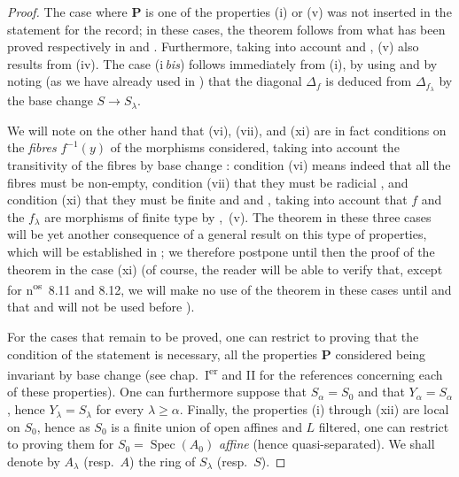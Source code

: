 \begin{proof}
The case where $\mathbf{P}$ is one of the properties (i) or (v) was not inserted in the statement for the record; in these cases, the theorem follows from what has been proved respectively in  and .
Furthermore, taking into account  and , (v) also results from (iv).
The case (i\,\emph{bis}) follows immediately from (i), by using  and by noting (as we have already used in ) that the diagonal $\Delta_f$ is deduced from $\Delta_{f_\lambda}$ by the base change $S\to S_\lambda$.

We will note on the other hand that (vi), (vii), and (xi) are in fact conditions on the \emph{fibres} $f^{-1}(y)$ of the morphisms considered, taking into account the transitivity of the fibres by base change : condition (vi) means indeed that all the fibres must be non-empty, condition (vii) that they must be radicial , and condition (xi) that they must be finite  and  and , taking into account that $f$ and the $f_\lambda$ are morphisms of finite type by ,~(v).
The theorem in these three cases will be yet another consequence of a general result on this type of properties, which will be established in ; we therefore postpone until then the proof of the theorem in the case (xi) (of course, the reader will be able to verify that, except for n\textsuperscript{os}~8.11 and 8.12, we will make no use of the theorem in these cases until  and that  and  will not be used before ).

For the cases that remain to be proved, one can restrict to proving that the condition of the statement is necessary, all the properties $\mathbf{P}$ considered being invariant by base change (see chap.~I\textsuperscript{er} and II for the references concerning each of these properties).
One can furthermore suppose that $S_\alpha=S_0$ and that $Y_\alpha=S_\alpha$, hence $Y_\lambda=S_\lambda$ for every $\lambda\geqslant\alpha$.
Finally, the properties (i) through (xii) are local on $S_0$, hence as $S_0$ is a finite union of open affines and $L$ filtered, one can restrict to proving them for $S_0=\operatorname{Spec}(A_0)$ \emph{affine} (hence quasi-separated).
We shall denote by $A_\lambda$ (resp.\ $A$) the ring of $S_\lambda$ (resp.\ $S$).


\end{proof}
